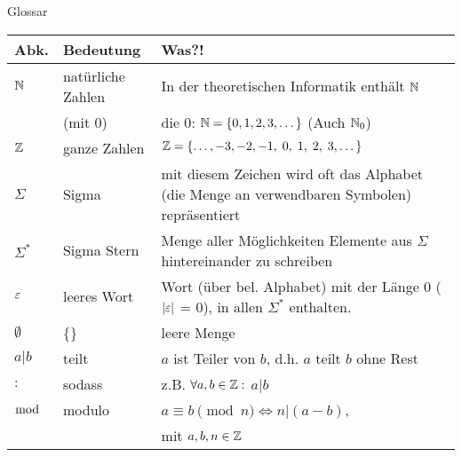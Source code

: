%
%
%
%

\begin{frame}[fragile]{Glossar}
	\small
	\begin{tabular}{p{} p{} p{}}
		\toprule
		Abk.&Bedeutung&Was?!\\
		\midrule
		$\mathbb{N}$&natürliche Zahlen&In der theoretischen Informatik enthält $\mathbb{N}$ \\ 
		&(mit $0$)&die $0$: $\mathbb{N}=\{0,1,2,3,\dots\}$ (Auch $\mathbb{N}_0$)\\
		$\mathbb{Z}$&ganze Zahlen& $\mathbb{Z}=\{\dots,-3,-2,-1,\;0,\;1,\;2,\;3,\dots\}$\\
		$\Sigma$ & Sigma& mit diesem Zeichen wird oft das Alphabet (die Menge an verwendbaren Symbolen) repräsentiert\\
		$\Sigma^\ast$&Sigma Stern&Menge aller Möglichkeiten Elemente aus $\Sigma$ hintereinander zu schreiben\\
		$\varepsilon$ & leeres Wort & Wort (über bel. Alphabet) mit der Länge $0$ ($|\varepsilon|$ = 0), in allen $\Sigma^\ast$ enthalten.\\
		$\emptyset$&\{\}&leere Menge\\
		$a|b$&teilt& $a$ ist Teiler von $b$, d.h. $a$ teilt $b$ ohne Rest\\
		$:$&sodass&z.B. $\forall a,b\in\mathbb{Z}:$ $a|b$\\
		$\bmod$&modulo& $a\equiv b \pmod n \iff n|(a-b)$,\\
		&& mit $a,b,n\in\mathbb{Z}$\\
		\bottomrule
	\end{tabular}
\end{frame}